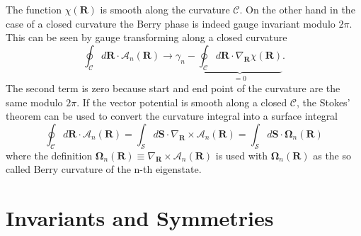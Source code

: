 \documentclass[a4paper,11pt]{report}
\begin{document}
The function $\chi(\bm{R})$ is smooth along the curvature $\mathcal{C}$. On the other hand in the case of a closed curvature the Berry phase is 
indeed gauge invariant modulo $2\pi$. This can be seen by gauge transforming  along a closed curvature
\begin{equation}
 \oint_\mathcal{C}d\bm{R}\cdot\bm{\mathcal{A}}_n(\bm{R}) \rightarrow \gamma_n 
 - \underbrace{\oint_\mathcal{C}d\bm{R}\cdot\nabla_{\bm{R}}\chi(\bm{R})}_{= 0}.
\end{equation}
The second term is zero because start and end point of the curvature are the same modulo $2\pi$. If the vector potential is smooth along a closed 
$\mathcal{C}$, the Stokes' theorem can be used to convert the curvature integral into a surface integral
\begin{equation}
 \oint_\mathcal{C}d\bm{R}\cdot\bm{\mathcal{A}}_n(\bm{R}) = \int_\mathcal{S}d\bm{S}\cdot\nabla_{\bm{R}}\times\bm{\mathcal{A}}_n(\bm{R})
 = \int_\mathcal{S}d\bm{S}\cdot\bm{\Omega}_n(\bm{R})
\end{equation}
where the definition $\bm{\Omega}_n(\bm{R}) \equiv \nabla_{\bm{R}}\times\bm{\mathcal{A}}_n(\bm{R})$ is used with $\bm{\Omega}_n(\bm{R})$
as the so called Berry curvature of the n-th eigenstate. 

\section{Invariants and Symmetries}
\end{document}
